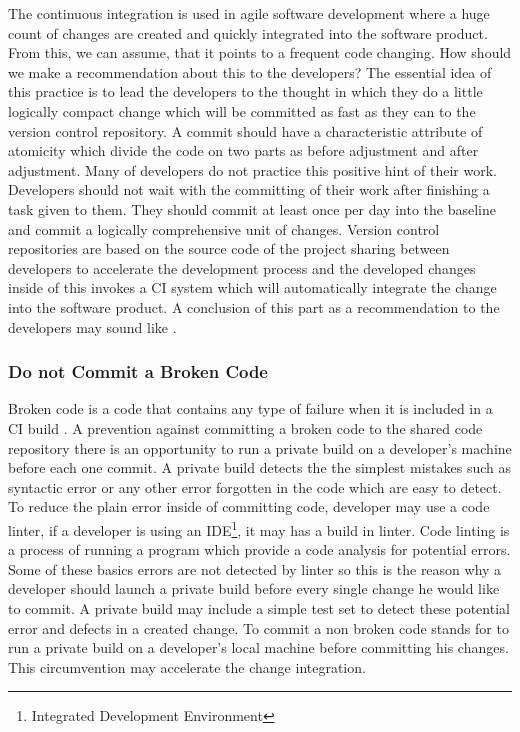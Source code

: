 The continuous integration is used in agile software development where a huge count of changes are created and quickly integrated into the software product. From this, we can assume, that it points to a frequent code changing. How should we make a recommendation about this to the developers? The essential idea of this practice is to lead the developers to the thought in which they do a little logically compact change which will be committed as fast as they can to the version control repository. A commit should have a characteristic attribute of atomicity which divide the code on two parts as before adjustment and after adjustment. Many of developers do not practice this positive hint of their work. Developers should not wait with the committing of their work after finishing a task given to them. They should commit at least once per day into the baseline and commit a logically comprehensive unit of changes. Version control repositories are based on the source code of the project sharing between developers to accelerate the development process and the developed changes inside of this invokes a CI system which will automatically integrate the change into the software product. A conclusion of this part as a recommendation to the developers may sound like .

\subsubsection{Do not Commit a Broken Code}

Broken code is a code that contains any type of failure when it is included in a CI build \cite{CIQualityFramework}. A prevention against committing a broken code to the shared code repository there is an opportunity to run a private build on a developer's machine before each one commit. A private build detects the the simplest mistakes such as syntactic error or any other error forgotten in the code which are easy to detect. To reduce the plain error inside of committing code, developer may use a code linter, if a developer is using an IDE\footnote{Integrated Development Environment}, it may has a build in linter. Code linting is a process of running a program which provide a code analysis for potential errors. Some of these basics errors are not detected by linter so this is the reason why a developer should launch a private build before every single change he would like to commit. A private build may include a simple test set to detect these potential error and defects in a created change. To commit a non broken code stands for to run a private build on a developer's local machine before committing his changes. This circumvention may accelerate the change integration.

